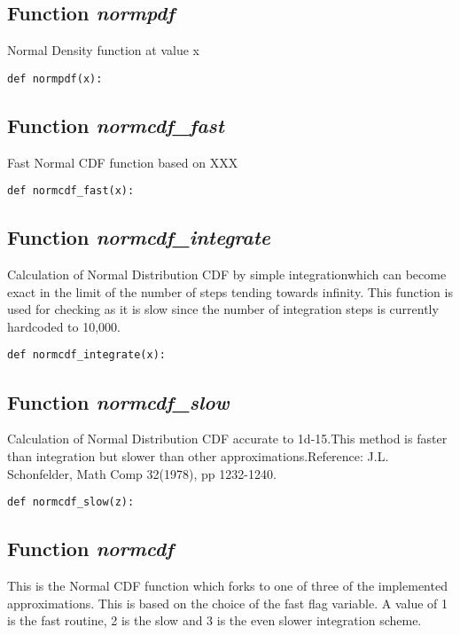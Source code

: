 \documentclass[twoside,11pt]{book}
\begin{document}
\subsection{Function {\it normpdf}}
Normal Density function at value x

\begin{lstlisting}
def normpdf(x):
\end{lstlisting}

\subsection{Function {\it normcdf\_fast}}
Fast Normal CDF function based on XXX 

\begin{lstlisting}
def normcdf_fast(x):
\end{lstlisting}

\subsection{Function {\it normcdf\_integrate}}
Calculation of Normal Distribution CDF by simple integrationwhich can become exact in the limit of the number of steps tending towards infinity. This function is used for checking as it is slow since the number of integration steps is currently hardcoded to 10,000.

\begin{lstlisting}
def normcdf_integrate(x):
\end{lstlisting}

\subsection{Function {\it normcdf\_slow}}
Calculation of Normal Distribution CDF accurate to 1d-15.This method is faster than integration but slower than other approximations.Reference: J.L. Schonfelder, Math Comp 32(1978), pp 1232-1240. 

\begin{lstlisting}
def normcdf_slow(z):
\end{lstlisting}

\subsection{Function {\it normcdf}}
This is the Normal CDF function which forks to one of three of the implemented approximations. This is based on the choice of the fast flag variable. A value of 1 is the fast routine, 2 is the slow and 3 is the even slower integration scheme. 
\end{document}
